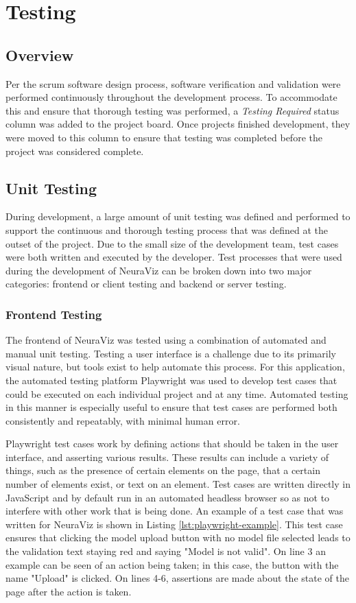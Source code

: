 \section{Testing}
\label{sec:Testing}

\subsection{Overview} 
Per the scrum software design process, software verification and validation were performed continuously throughout the development process. To accommodate this and ensure that thorough testing was performed, a \textit{Testing Required} status column was added to the project board. Once projects finished development, they were moved to this column to ensure that testing was completed before the project was considered complete.

\subsection{Unit Testing}
During development, a large amount of unit testing was defined and performed to support the continuous and thorough testing process that was defined at the outset of the project. Due to the small size of the development team, test cases were both written and executed by the developer. Test processes that were used during the development of NeuraViz can be broken down into two major categories: frontend or client testing and backend or server testing.

\subsubsection{Frontend Testing}
The frontend of NeuraViz was tested using a combination of automated and manual unit testing. Testing a user interface is a challenge due to its primarily visual nature, but tools exist to help automate this process. For this application, the automated testing platform Playwright \cite{playwright} was used to develop test cases that could be executed on each individual project and at any time. Automated testing in this manner is especially useful to ensure that test cases are performed both consistently and repeatably, with minimal human error. 

Playwright test cases work by defining actions that should be taken in the user interface, and asserting various results. These results can include a variety of things, such as the presence of certain elements on the page, that a certain number of elements exist, or text on an element. Test cases are written directly in JavaScript and by default run in an automated headless browser so as not to interfere with other work that is being done. An example of a test case that was written for NeuraViz is shown in Listing \ref{lst:playwright-example}. This test case ensures that clicking the model upload button with no model file selected leads to the validation text staying red and saying "Model is not valid". On line 3 an example can be seen of an action being taken; in this case, the button with the name "Upload" is clicked. On lines 4-6, assertions are made about the state of the page after the action is taken.

